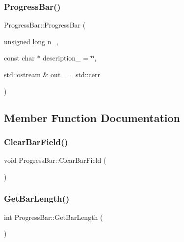 \subsubsection{\texorpdfstring{ProgressBar()}{ProgressBar()}\hspace{0.1cm}{\footnotesize\ttfamily [2/2]}}
{\footnotesize\ttfamily Progress\+Bar\+::\+Progress\+Bar (\begin{DoxyParamCaption}\item[{unsigned long}]{n\+\_\+,  }\item[{const char $\ast$}]{description\+\_\+ = {\ttfamily \char`\"{}\char`\"{}},  }\item[{std\+::ostream \&}]{out\+\_\+ = {\ttfamily std\+:\+:cerr} }\end{DoxyParamCaption})}



\subsection{Member Function Documentation}
\mbox{\label{class_progress_bar_a2f4ce86f697a3f473639e67972a61c57}} 
\subsubsection{\texorpdfstring{ClearBarField()}{ClearBarField()}}
{\footnotesize\ttfamily void Progress\+Bar\+::\+Clear\+Bar\+Field (\begin{DoxyParamCaption}{ }\end{DoxyParamCaption})\hspace{0.3cm}{\ttfamily [private]}}

\mbox{\label{class_progress_bar_acd24506c1780a5c335c175e53482ea3c}} 
\subsubsection{\texorpdfstring{GetBarLength()}{GetBarLength()}}
{\footnotesize\ttfamily int Progress\+Bar\+::\+Get\+Bar\+Length (\begin{DoxyParamCaption}{ }\end{DoxyParamCaption})\hspace{0.3cm}{\ttfamily [private]}}


